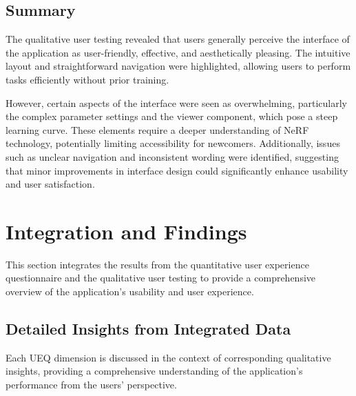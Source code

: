
\subsection*{Summary}
\label{sec:result:qualitative_summary}

The qualitative user testing revealed that users generally perceive the interface of the application as user-friendly, effective, and aesthetically pleasing.
The intuitive layout and straightforward navigation were highlighted, allowing users to perform tasks efficiently without prior training.

However, certain aspects of the interface were seen as overwhelming, particularly the complex parameter settings and the viewer component, which pose a steep learning curve.
These elements require a deeper understanding of NeRF technology, potentially limiting accessibility for newcomers.
Additionally, issues such as unclear navigation and inconsistent wording were identified, suggesting that minor improvements in interface design could significantly enhance usability and user satisfaction.

\section{Integration and Findings}
\label{sec:result:findings}

This section integrates the results from the quantitative user experience questionnaire and the qualitative user testing to provide a comprehensive overview of the application's usability and user experience.

\subsection*{Detailed Insights from Integrated Data}
\label{subsec:findings:detailed_insights}
Each UEQ dimension is discussed in the context of corresponding qualitative insights, providing a comprehensive understanding of the application’s performance from the users' perspective.

